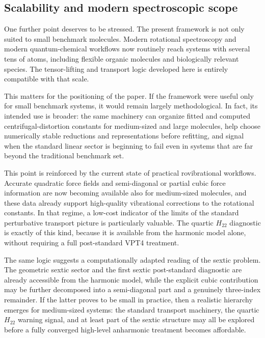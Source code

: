 \documentclass[journal=jacsat,manuscript=article]{achemso}
\begin{document}
\subsection{Scalability and modern spectroscopic scope}

One further point deserves to be stressed. The present framework is not only
suited to small benchmark molecules. Modern rotational spectroscopy and modern
quantum-chemical workflows now routinely reach systems with several tens of
atoms, including flexible organic molecules and biologically relevant species.
The tensor-lifting and transport logic developed here is entirely compatible
with that scale.

This matters for the positioning of the paper. If the framework were useful
only for small benchmark systems, it would remain largely methodological. In
fact, its intended use is broader: the same machinery can organize fitted and
computed centrifugal-distortion constants for medium-sized and large
molecules, help choose numerically stable reductions and representations
before refitting, and signal when the standard linear sector is beginning to
fail even in systems that are far beyond the traditional benchmark set.

This point is reinforced by the current state of practical rovibrational
workflows. Accurate quadratic force fields and semi-diagonal or partial cubic
force information are now becoming available also for medium-sized molecules,
and these data already support high-quality vibrational corrections to the
rotational constants. In that regime, a low-cost indicator of the limits of
the standard perturbative transport picture is particularly valuable. The
quartic $H_{22}$ diagnostic is exactly of this kind, because it is available
from the harmonic model alone, without requiring a full post-standard VPT4
treatment.

The same logic suggests a computationally adapted reading of the sextic
problem. The geometric sextic sector and the first sextic post-standard
diagnostic are already accessible from the harmonic model, while the explicit
cubic contribution may be further decomposed into a semi-diagonal part and a
genuinely three-index remainder. If the latter proves to be small in practice,
then a realistic hierarchy emerges for medium-sized systems: the standard
transport machinery, the quartic $H_{22}$ warning signal, and at least part of
the sextic structure may all be explored before a fully converged high-level
anharmonic treatment becomes affordable.
\end{document}
